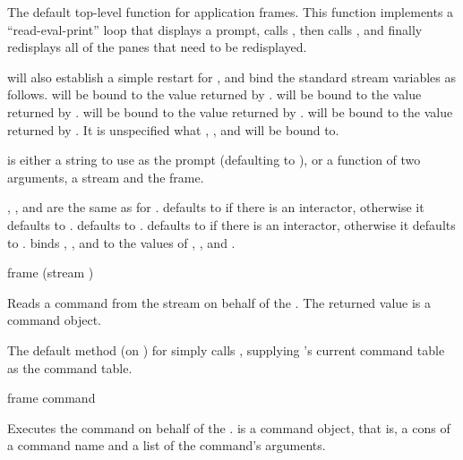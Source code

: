 The default top-level function for application frames.  This function implements
a ``read-eval-print'' loop that displays a prompt, calls
, then calls , and finally
redisplays all of the panes that need to be redisplayed.

 will also establish a simple restart for
, and bind the standard stream variables as follows.
 will be bound to the value returned by
.   will be bound to the value
returned by .   will be bound to the
value returned by .   will be bound to the
value returned by .  It is unspecified what
, , and  will be bound to.

 is either a string to use as the prompt (defaulting to
), or a function of two arguments, a stream and the frame.

, , and 
are the same as for .   defaults to
 if there is an interactor, otherwise it
defaults to .   defaults to
.   defaults to
 if there is an
interactor, otherwise it defaults to
.
 binds ,
, and  to the values of
, , and .


 {frame \key (stream )}

Reads a command from the stream  on behalf of the 
.  The returned value is a command object.

The default method (on ) for
 simply calls , supplying 's
current command table as the command table.

 {frame command}

Executes the command  on behalf of the  .
 is a command object, that is, a cons of a command name and a list
of the command's arguments.

